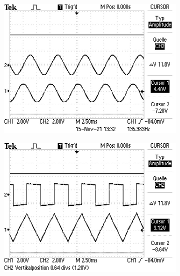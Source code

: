 \begin{figure}[H]
  \centering
  \begin{subfigure}{.4\textwidth}
    \includegraphics[width=\linewidth]{data/ALL0059/F0059TEK.JPG}
  \end{subfigure}
  \begin{subfigure}{.4\textwidth}
    \includegraphics[width=\linewidth]{data/ALL0060/F0060TEK.JPG}
  \end{subfigure}
  \begin{subfigure}{.4\textwidth}

\end{subfigure}
\end{figure}
